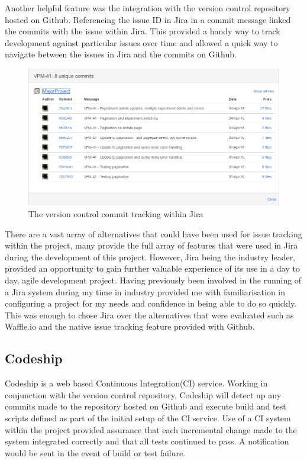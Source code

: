 Another helpful feature was the integration with the version control repository hosted on Github. Referencing the issue ID in Jira in a commit message linked the commits with the issue within Jira. This provided a handy way to track development against particular issues over time and allowed a quick way to navigate between the issues in Jira and the commits on Github. 

\begin{figure}[H]
    \centering
    \includegraphics[width=\textwidth]{images/tools/jira_commit}
    \caption{The version control commit tracking within Jira}
    \label{fig:jira_commit}
\end{figure} 

There are a vast array of alternatives that could have been used for issue tracking within the project, many provide the full array of features that were used in Jira during the development of this project. However, Jira being the industry leader, provided an opportunity to gain further valuable experience of its use in a day to day, agile development project. Having previously been involved in the running of a Jira system during my time in industry provided me with familiarisation in configuring a project for my needs and confidence in being able to do so quickly. This was enough to chose Jira over the alternatives that were evaluated such as Waffle.io and the native issue tracking feature provided with Github.

\subsection{Codeship} 
Codeship\cite{_codeship} is a web based Continuous Integration(CI) service. Working in conjunction with the version control repository, Codeship will detect up any commits made to the repository hosted on Github and execute build and test scripts defined as part of the initial setup of the CI service. Use of a CI system within the project provided assurance that each incremental change made to the system integrated correctly and that all tests continued to pass. A notification would be sent in the event of build or test failure.  

